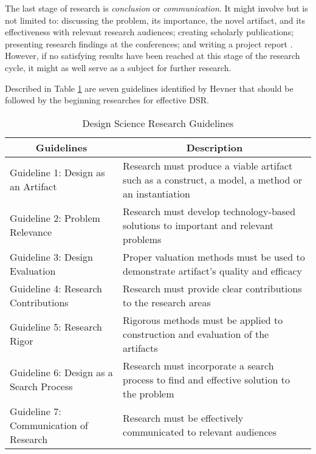 The last stage of research is \textit{conclusion} or \textit{communication}. It
might involve but is not limited to: discussing the problem, its importance, the
novel artifact, and its effectiveness with relevant research audiences; creating
scholarly publications; presenting research findings at the conferences; and
writing a project report \citep{Archer1984}. However, if no satisfying results
have been reached at this stage of the research cycle, it might as well serve as
a subject for further research.

Described in Table \ref{tab:guidelines} are seven guidelines identified by
Hevner \citeyearpar{Hevner2004} that should be followed by the beginning
researches for effective DSR.

\begin{table}[htb]
  \caption[Design Science Research Guidelines]{Design Science Research
  Guidelines \citep{Hevner2004}}
  \begin{center}
    \begin{tabular}{| l | p{6.5cm} |}
    \hline
     \multicolumn{1}{|c|}{\textbf{Guidelines}} &
     \multicolumn{1}{c|}{\textbf{Description}} \\
     \hline
     Guideline 1: Design as an Artifact & Research must produce a viable
    artifact such as a construct, a model, a method or an instantiation \\ \hline
     Guideline 2: Problem Relevance & Research must develop technology-based
     solutions to important and relevant problems \\ \hline 
     Guideline 3: Design Evaluation & Proper valuation methods must be used to
     demonstrate artifact's quality and efficacy \\ \hline 
     Guideline 4: Research Contributions & Research must provide clear
     contributions to the research areas \\ \hline 
     Guideline 5: Research Rigor & Rigorous methods must be applied to
     construction and evaluation of the artifacts \\ \hline 
     Guideline 6: Design as a Search Process & Research must incorporate a
     search process to find and effective solution to the problem \\ \hline
     Guideline 7: Communication of Research & Research must be effectively
     communicated to relevant audiences \\ \hline
    \end{tabular}
  \end{center}
  \label{tab:guidelines}
\end{table}

